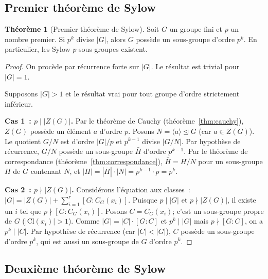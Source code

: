 \documentclass[12pt,a4paper,openany]{book}
\theoremstyle{definition}
\newtheorem{theoreme}{Théorème}[chapter]
\begin{document}
\subsection{Premier théorème de Sylow}\label{subsec:sylow-1}

\begin{theoreme}[Premier théorème de Sylow]\label{thm:sylow-1}
  Soit $G$ un groupe fini et $p$ un nombre premier. Si $p^k$ divise
  $|G|$, alors $G$ possède un sous-groupe d'ordre
  $p^k$.
  En particulier, les Sylow $p$-sous-groupes existent.
\end{theoreme}

\begin{proof}
  On procède par récurrence forte sur $|G|$. Le résultat est trivial
  pour $|G|=1$.

  Supposons $|G|>1$ et le résultat vrai pour tout groupe d'ordre
  strictement inférieur.

  \medskip

  \textbf{Cas 1~: $p\mid |Z(G)|$.}
  Par le théorème de Cauchy (théorème~\ref{thm:cauchy}),
  $Z(G)$ possède un élément $a$ d'ordre $p$. Posons
  $N=\langle a\rangle\trianglelefteq G$ (car $a\in Z(G)$).
  Le quotient $G/N$ est d'ordre $|G|/p$ et $p^{k-1}$ divise
  $|G/N|$. Par hypothèse de récurrence, $G/N$ possède un sous-groupe
  $\bar{H}$ d'ordre $p^{k-1}$. Par le théorème de correspondance
  (théorème~\ref{thm:correspondance}), $\bar{H}=H/N$ pour un
  sous-groupe $H$ de $G$ contenant $N$, et
  $|H| = |\bar{H}|\cdot|N| = p^{k-1}\cdot p = p^k$.

  \medskip

  \textbf{Cas 2~: $p\nmid |Z(G)|$.}
  Considérons l'équation aux classes~:
  $|G| = |Z(G)| + \sum_{i=1}^r [G:C_G(x_i)]$.
  Puisque $p\mid |G|$ et $p\nmid |Z(G)|$, il existe un $i$ tel que
  $p\nmid [G:C_G(x_i)]$.
  Posons $C=C_G(x_i)$; c'est un sous-groupe propre de $G$
  ($|\mathrm{Cl}(x_i)|>1$).
  Comme $|G|=|C|\cdot[G:C]$ et $p^k\mid|G|$ mais
  $p\nmid [G:C]$, on a $p^k\mid |C|$.
  Par hypothèse de récurrence (car $|C|<|G|$), $C$ possède un
  sous-groupe d'ordre $p^k$, qui est aussi un sous-groupe de $G$
  d'ordre $p^k$.
\end{proof}

\subsection{Deuxième théorème de Sylow}\label{subsec:sylow-2}
\end{document}
